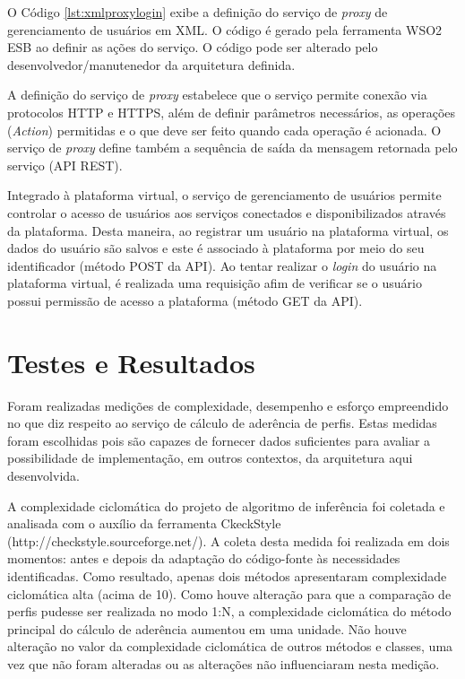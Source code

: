 O Código \ref{lst:xmlproxylogin} exibe a definição do serviço de \textit{proxy} de gerenciamento de usuários em XML. O código é gerado pela ferramenta WSO2 ESB ao definir as ações do serviço. O código pode ser alterado pelo desenvolvedor/manutenedor da arquitetura definida.

A definição do serviço de \textit{proxy} estabelece que o serviço permite conexão via protocolos HTTP e HTTPS, além de definir parâmetros necessários, as operações (\textit{Action}) permitidas e o que deve ser feito quando cada operação é acionada. O serviço de \textit{proxy} define também a sequência de saída da mensagem retornada pelo serviço (API REST).

Integrado à plataforma virtual, o serviço de gerenciamento de usuários permite controlar o acesso de usuários aos serviços conectados e disponibilizados através da plataforma. Desta maneira, ao registrar um usuário na plataforma virtual, os dados do usuário são salvos e este é associado à plataforma por meio do seu identificador (método POST da API). Ao tentar realizar o \textit{login} do usuário na plataforma virtual, é realizada uma requisição afim de verificar se o usuário possui permissão de acesso a plataforma (método GET da API).

\section{Testes e Resultados}
Foram realizadas medições de complexidade, desempenho e esforço empreendido no que diz respeito ao serviço de cálculo de aderência de perfis. Estas medidas foram escolhidas pois são capazes de fornecer dados suficientes para avaliar a possibilidade de implementação, em outros contextos, da arquitetura aqui desenvolvida.

A complexidade ciclomática do projeto de algoritmo de inferência foi coletada e analisada com o auxílio da ferramenta CkeckStyle (http://checkstyle.sourceforge.net/). A coleta desta medida foi realizada em dois momentos: antes e depois da adaptação do código-fonte às necessidades identificadas. Como resultado, apenas dois métodos apresentaram complexidade ciclomática alta (acima de 10). Como houve alteração para que a comparação de perfis pudesse ser realizada no modo 1:N, a complexidade ciclomática do método principal do cálculo de aderência aumentou em uma unidade. Não houve alteração no valor da complexidade ciclomática de outros métodos e classes, uma vez que não foram alteradas ou as alterações não influenciaram nesta medição.

